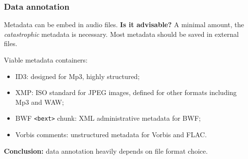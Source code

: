 \documentclass{beamer}
\newcommand\rb[1]{\textcolor{ThemeRed}{\textbf{#1}}}
\begin{document}
  \begin{frame}
    \frametitle{Data annotation}

    Metadata can be embed in audio files. \rb{Is it advisable?} A minimal amount, the \textit{catastrophic} metadata is necessary. Most metadata should be saved in external files.

    \vspace{1em}

    Viable metadata containers:

    \vspace{0.5em}

    \begin{itemize}
      \item ID3: designed for Mp3, highly structured;
      \item XMP: ISO standard for JPEG images, defined for other formats including Mp3 and WAW;
      \item BWF \texttt{<bext>} chunk: XML administrative metadata for BWF;
      \item Vorbis comments: unstructured metadata for Vorbis and FLAC.
    \end{itemize}

    \vspace{1em}

    \rb{Conclusion:} data annotation heavily depends on file format choice.

  \end{frame}
\end{document}

